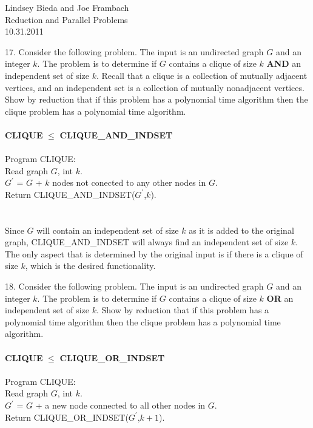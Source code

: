 \documentclass[10pt]{article}
\newcommand{\tab}{\hspace*{2em}}
\begin{document}
	\begin{flushright}
	Lindsey Bieda and Joe Frambach\\
	Reduction and Parallel Problems\\
	10.31.2011
	\end{flushright}
	17. Consider the following problem. The input is an undirected graph $G$ and an integer $k$. The problem
	is to determine if $G$ contains a clique of size $k$ \textbf{AND} an independent set of size $k$. Recall that a
	clique is a collection of mutually adjacent vertices, and an independent set is a collection of mutually
	nonadjacent vertices. Show by reduction that if this problem has a polynomial time algorithm then
	the clique problem has a polynomial time algorithm.
	\\
	\\
	\textbf{CLIQUE} $\leq$ \textbf{CLIQUE\_AND\_INDSET}
	\\
	\\
	Program CLIQUE:\\
	\tab Read graph $G$, int $k$.\\
	\tab $G^\prime$ = $G$ + $k$ nodes not conected to any other nodes in $G$.\\
	\tab Return CLIQUE\_AND\_INDSET($G^\prime$,$k$).\\
	\\
	\\
	Since $G$ will contain an independent set of size $k$ as it is added to the original graph, CLIQUE\_AND\_INDSET 
	will always find an independent set of size $k$. The only aspect that is determined by the original input is if 
	there is a clique of size $k$, which is the desired functionality. 
	
	\newpage

	18. Consider the following problem. The input is an undirected graph $G$ and an integer $k$. The problem
	is to determine if $G$ contains a clique of size $k$ \textbf{OR} an independent set of size $k$. Show by reduction
	that if this problem has a polynomial time algorithm then the clique problem has a polynomial time
	algorithm.
	\\
	\\
	\textbf{CLIQUE} $\leq$ \textbf{CLIQUE\_OR\_INDSET}
	\\
	\\
	Program CLIQUE:\\
	\tab Read graph $G$, int $k$.\\
	\tab $G^\prime$ = $G$ + a new node connected to all other nodes in $G$.\\
	\tab Return CLIQUE\_OR\_INDSET($G^\prime$,$k + 1$).\\
\end{document}
